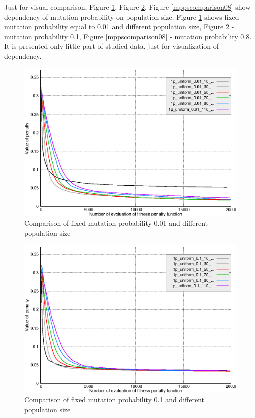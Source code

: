 \documentclass[12pt]{report}
\begin{document}
Just for visual comparison, Figure \ref{mppscomparison001}, Figure \ref{mppscomparison01}, Figure \ref{mppscomparison08} show dependency of mutation probability on population size. Figure \ref{mppscomparison001} shows fixed mutation probability equal to 0.01 and different population size, Figure \ref{mppscomparison01} - mutation probability 0.1, Figure \ref{mppscomparison08} - mutation probability 0.8. It is presented only little part of studied data, just for visualization of dependency.

\begin{figure}
    \centering
    \includegraphics[width=5.0in]{mppscomparison001}
    \caption{Comparison of fixed mutation probability 0.01 and different population size}
    \label{mppscomparison001}
\end{figure}

\begin{figure}
    \centering
    \includegraphics[width=5.0in]{mppscomparison01}
    \caption{Comparison of fixed mutation probability 0.1 and different population size}
    \label{mppscomparison01}
\end{figure}
\end{document}
